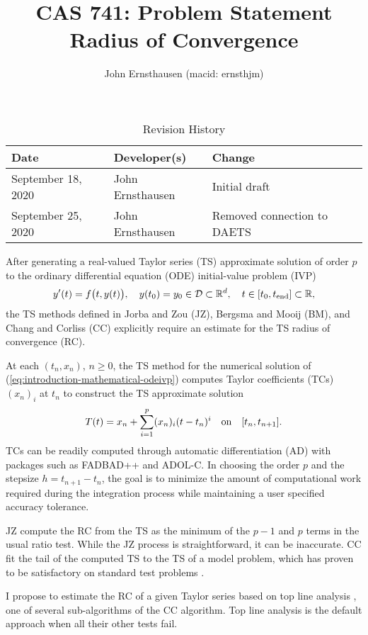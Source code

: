 \documentclass{article}
\title{CAS 741: Problem Statement\\Radius of Convergence}
\author{John Ernsthausen (macid: ernsthjm)}
\date{}
\newcommand{\EQ}[1]{\begin{align} {#1} \end{align}}
\newcommand{\ode}{{\footnotesize ODE}\xspace}
\newcommand{\ivp}{{\footnotesize IVP}\xspace}
\newcommand{\fadbad}{{\footnotesize FADBAD++}\xspace}
\newcommand{\adolc}{{\footnotesize ADOL-C}\xspace}
\newcommand{\daets}{{\footnotesize DAETS}\xspace}
\newcommand{\parn}[1]{( {#1} )}
\newcommand{\pbg}[1]{\bigl(  {#1} \bigr)}
\def\Rz{\mathbb{R}}
\newcommand{\iode}{\protect{\makebox{$[t_0,\tend]$}}\xspace}
\newcommand{\lode}{\protect{\makebox{$[t_n,t_{n+1}]$}}\xspace}
\newcommand{\tend}{t_\text{end}}
\newcommand{\tc}[2]{(#1)_{#2}}
\newcommand{\Tp}{T}
\newcommand{\xn}{x_{n}}
\newcommand{\tn}{t_{n}}
\renewcommand{\eqref}[1]{(\ref{eq:#1})}
\begin{document}
\maketitle

\begin{table}[hp]
\caption{Revision History} \label{TblRevisionHistory}
\begin{tabularx}{\textwidth}{llX}
\toprule
\textbf{Date} & \textbf{Developer(s)} & \textbf{Change}\\
\midrule
September 18, 2020 & John Ernsthausen & Initial draft\\
September 25, 2020 & John Ernsthausen & Removed connection to \daets\\
\bottomrule
\end{tabularx}
\end{table}

After generating a real-valued Taylor series (TS) approximate solution of order $p$ to the
ordinary differential equation (\ode) initial-value problem (\ivp) 
\EQ
{
  \label{eq:introduction-mathematical-odeivp}
  y'\parn{t} = f\pbg{t,y\parn{t}},
  \quad
  y\parn{t_0} = y_0 \in \mathcal D \subset \Rz^d,
  \quad
  t \in \iode \subset \Rz,
}
the TS methods defined in
Jorba and Zou \cite{jorba2005software} (JZ),
Bergsma and Mooij \cite{bergsma2016application} (BM),
and
Chang and Corliss \cite{chang1982} (CC)
explicitly require an estimate for the TS radius of convergence (RC).

At each $\parn{t_n,x_n}$, $n \geq 0$, the TS method for the numerical solution
of \eqref{introduction-mathematical-odeivp} computes Taylor coefficients (TCs)
$\tc{\xn}{i}$ at $t_{n}$ to construct the TS approximate solution
\begin{align}
  \label{eq:tss}
  \Tp(t) = \xn + \sum_{i=1}^{p}\tc{\xn}{i}(t-\tn)^{i} \quad\mbox{on}\quad \lode.
\end{align}
TCs can be readily computed through automatic differentiation (AD) with packages
such as \fadbad \cite{FADBAD++} and \adolc \cite{GriewankADBook2/e}.
In choosing the order $p$ and the stepsize $h = t_{n+1} - t_n$, the goal is to minimize the amount
of computational work required during the integration process while maintaining a user specified accuracy tolerance. 

JZ compute the RC from the TS as the minimum of the $p-1$ and $p$ terms in the usual ratio test.
While the JZ process is straightforward, it can be inaccurate.
CC fit the tail of the computed TS to the TS of a model problem, which has proven to be satisfactory
on standard test problems \cite{enright1987examples}.

I propose to estimate the RC of a given Taylor series based on top line analysis
\cite[pp.~127--128]{chang1982}, one of several sub-algorithms of the CC algorithm.
Top line analysis is the default approach when all their other tests fail.

%  
%  

 

\end{document}
